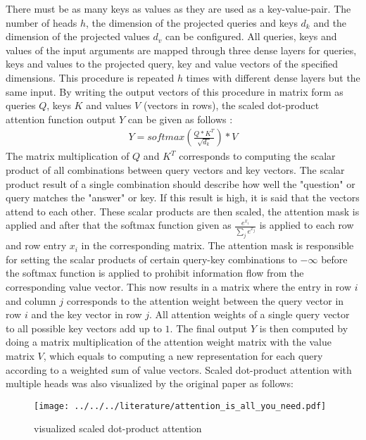 \documentclass[draft,final]{vutinfth} %
\begin{document}
    There must be as many keys as values as they are used as a key-value-pair.
    The number of heads $h$, the dimension of the projected queries and keys $d_k$ and the dimension of the projected values $d_v$ can be configured.
    All queries, keys and values of the input arguments are mapped through three dense layers for queries, keys and values to the projected query, key and value vectors of the specified dimensions.
    This procedure is repeated $h$ times with different dense layers but the same input. 
    By writing the output vectors of this procedure in matrix form as queries $Q$, keys $K$ and values $V$ (vectors in rows), the scaled dot-product attention function output $Y$ can be given as follows \cite[p. 4]{Transformer}:
    \begin{align}
    \label{sdpa}
    Y = softmax \left( \frac{Q * K^T}{\sqrt{d_k}} \right) * V
    \end{align}
    The matrix multiplication of $Q$ and $K^T$ corresponds to computing the scalar product of all combinations between query vectors and key vectors.
    The scalar product result of a single combination should describe how well the "question" or query matches the "answer" or key.
    If this result is high, it is said that the vectors attend to each other.
    These scalar products are then scaled, the attention mask is applied and after that the softmax function given as $\frac{e^{x_i}}{\sum_j{e^{x_j}}}$ is applied to each row and row entry $x_i$ in the corresponding matrix.
    The attention mask is responsible for setting the scalar products of certain query-key combinations to $-\infty$ before the softmax function is applied to prohibit information flow from the corresponding value vector.
    This now results in a matrix where the entry in row $i$ and column $j$ corresponds to the attention weight between the query vector in row $i$ and the key vector in row $j$. 
    All attention weights of a single query vector to all possible key vectors add up to $1$.
    The final output $Y$ is then computed by doing a matrix multiplication of the attention weight matrix with the value matrix $V$, which equals to computing a new representation for each query according to a weighted sum of value vectors.
    Scaled dot-product attention with multiple heads was also visualized by the original paper as follows:
    \begin{figure}[H]
        \centering{}
        \texttt{[image: ../../../literature/attention\_is\_all\_you\_need.pdf]}
        \caption{visualized scaled dot-product attention \cite[p. 4]{Transformer}}
        \label{fig:sdpa_vis}
    \end{figure}
\end{document}
